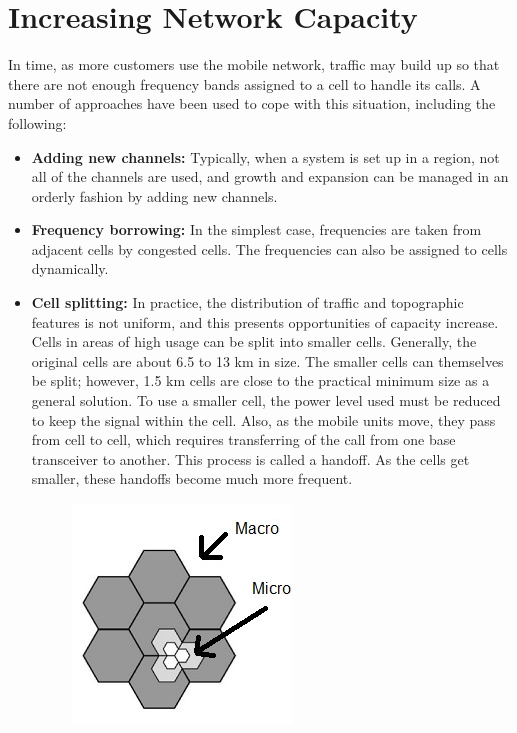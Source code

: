 \section{Increasing Network Capacity}{
    In time, as more customers use the mobile network, traffic may build up
    so that there are not enough frequency bands assigned to a cell
    to handle its calls. A number of approaches have been used to cope with this 
    situation, including the following:
    \begin{itemize}
        \item \textbf{Adding new channels:} Typically, when a system is set up
        in a region, not all of the channels are used, and growth and
        expansion can be managed in an orderly fashion by adding
        new channels.
        \item \textbf{Frequency borrowing:}  In the simplest case, frequencies
        are taken from adjacent cells by congested cells. The frequencies can also be assigned to cells dynamically.
        \item \textbf{Cell splitting:} In practice, the distribution of traffic and 
        topographic features is not uniform, and this presents opportunities of 
        capacity increase. Cells in areas of high usage can be split into smaller 
        cells. Generally, the original cells are about 6.5 to 13 km in size. The 
        smaller cells can themselves be split; however, 1.5 km cells are close to 
        the practical minimum size as a general solution. To use a smaller cell, the 
        power level used must be reduced to keep the signal within the cell. Also, 
        as the mobile units move, they pass from cell to cell, which requires 
        transferring of the call from one base transceiver to another. This process 
        is called a handoff. As the cells get smaller, these handoffs become much more 
        frequent.
        \begin{figure}[h]
            \centering
            \includegraphics[scale=0.5]{img/split.jpg}

\end{figure}
\end{itemize}}
